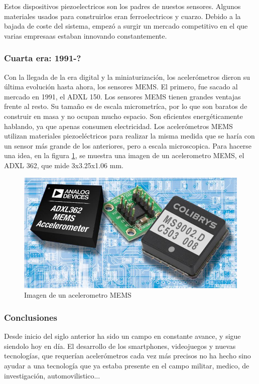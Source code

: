 \documentclass[12pt]{article}
\numberwithin{equation}{section}
\begin{document}
Estos dispositivos piezoelectricos son los padres de nuestos sensores. Algunos materiales usados para construirlos eran ferroelectricos y cuarzo. Debido a la bajada de coste del sistema, empezó a surgir un mercado competitivo en el que varias empresaas estaban innovando constantemente.

\subsubsection{Cuarta era: 1991-?}

Con la llegada de la era digital y la miniaturización, los acelerómetros dieron su última evolución hasta ahora, los sensores MEMS. El primero, fue sacado al mercado en 1991, el ADXL 150. Los sensores MEMS tienen grandes ventajas frente al resto. Su tamaño es de escala micrometríca, por lo que son baratos de construir en masa y no ocupan mucho espacio. Son eficientes energéticamente hablando, ya que apenas consumen electricidad. Los acelerómetros MEMS utilizan materiales piezoeléctricos para realizar la misma medida que se haría con un sensor más grande de los anteriores, pero a escala microscopica. Para hacerse una idea, en la figura \ref{fig:acelerometro}, se muestra una imagen de un acelerometro MEMS, el ADXL 362, que mide 3x3.25x1.06 mm.

\begin{figure}[h]
    \centering
    \includegraphics[width=1\textwidth]{MEMSpromo.jpg}
    \caption{Imagen de un acelerometro MEMS}
    \label{fig:acelerometro}
\end{figure}

\subsubsection{Conclusiones}

Desde inicio del siglo anterior ha sido un campo en constante avance, y sigue siendolo hoy en día. El desarrollo de los smartphones, videojuegos y nuevas tecnologías, que requerían acelerómetros cada vez más precisos no ha hecho sino ayudar a una tecnología que ya estaba presente en el campo militar, medico, de investigación, automovilistico... 
\end{document}

